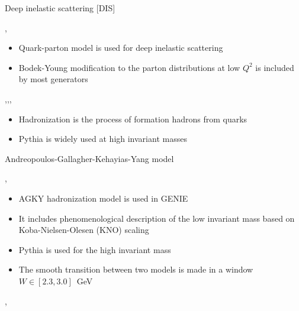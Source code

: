 \begin{slide}[toc=Deep Inelastic Scattering]{Deep inelastic scattering [DIS]}
\null\vfill

  \twocolumn
  {
    \sep
    \begin{itemize}
     \item Quark-parton model is used for deep inelastic scattering
     \item Bodek-Young modification to the parton distributions at low $Q^2$ is included by most generators
    \end{itemize}
  }
  {
    \scalebox{0.75}{}
  }
  
  
  \twocolumn
  {
    \sep\sep\sep
    \centering\scalebox{0.75}{}
  }
  {
    \begin{itemize}
     \item Hadronization is the process of formation hadrons from quarks
     \item Pythia is widely used at high invariant masses
    \end{itemize}
  }

\vfill\null
\end{slide}

\begin{slide}[toc=AGKY model]{Andreopoulos-Gallagher-Kehayias-Yang model}
\null\vfill

  \sep

  \twocolumn
  {
    \begin{itemize}
     \item AGKY hadronization model is used in GENIE
    \end{itemize}
  }
  {
    \centering\scalebox{0.75}{}  
  }
  
  \begin{itemize}
    \item It includes phenomenological description of the low invariant mass based on Koba-Nielsen-Olesen (KNO) scaling
    \item Pythia is used for the high invariant mass
    \item The smooth transition between two models is made in a window $W \in [2.3, 3.0]$~GeV
  \end{itemize}
  
  \sep
  
  \centering

\vfill\null
\end{slide}

